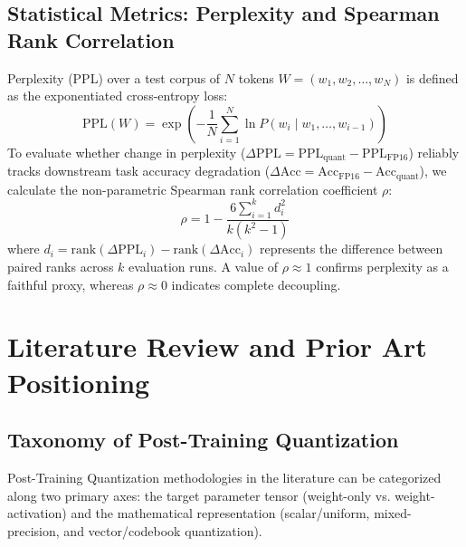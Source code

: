 \documentclass[12pt,a4paper,oneside]{report}
\begin{document}
\section{Statistical Metrics: Perplexity and Spearman Rank Correlation}
Perplexity (PPL) over a test corpus of $N$ tokens $W = (w_1, w_2, \dots, w_N)$ is defined as the exponentiated cross-entropy loss:
\begin{equation}
    \text{PPL}(W) = \exp \left( -\frac{1}{N} \sum_{i=1}^N \ln P(w_i \mid w_1, \dots, w_{i-1}) \right)
\end{equation}
To evaluate whether change in perplexity ($\Delta\text{PPL} = \text{PPL}_{\text{quant}} - \text{PPL}_{\text{FP16}}$) reliably tracks downstream task accuracy degradation ($\Delta\text{Acc} = \text{Acc}_{\text{FP16}} - \text{Acc}_{\text{quant}}$), we calculate the non-parametric Spearman rank correlation coefficient $\rho$:
\begin{equation}
    \rho = 1 - \frac{6 \sum_{i=1}^k d_i^2}{k(k^2 - 1)}
\end{equation}
where $d_i = \text{rank}(\Delta\text{PPL}_i) - \text{rank}(\Delta\text{Acc}_i)$ represents the difference between paired ranks across $k$ evaluation runs. A value of $\rho \approx 1$ confirms perplexity as a faithful proxy, whereas $\rho \approx 0$ indicates complete decoupling.

\chapter{Literature Review and Prior Art Positioning}

\section{Taxonomy of Post-Training Quantization}
Post-Training Quantization methodologies in the literature can be categorized along two primary axes: the target parameter tensor (weight-only vs. weight-activation) and the mathematical representation (scalar/uniform, mixed-precision, and vector/codebook quantization).
\end{document}
